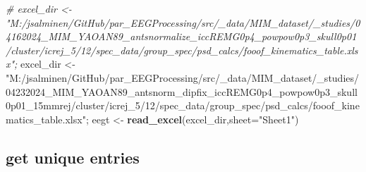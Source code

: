 \documentclass[
]{article}
\newenvironment{Shaded}{\begin{snugshade}}{\end{snugshade}}
\newcommand{\AttributeTok}[1]{\textcolor[rgb]{0.13,0.29,0.53}{#1}}
\newcommand{\CommentTok}[1]{\textcolor[rgb]{0.56,0.35,0.01}{\textit{#1}}}
\newcommand{\FunctionTok}[1]{\textcolor[rgb]{0.13,0.29,0.53}{\textbf{#1}}}
\newcommand{\NormalTok}[1]{#1}
\newcommand{\OtherTok}[1]{\textcolor[rgb]{0.56,0.35,0.01}{#1}}
\newcommand{\SpecialCharTok}[1]{\textcolor[rgb]{0.81,0.36,0.00}{\textbf{#1}}}
\newcommand{\StringTok}[1]{\textcolor[rgb]{0.31,0.60,0.02}{#1}}
\begin{document}
\begin{Shaded}
\begin{Highlighting}[]
\CommentTok{\# excel\_dir \textless{}{-}"M:/jsalminen/GitHub/par\_EEGProcessing/src/\_data/MIM\_dataset/\_studies/04162024\_MIM\_YAOAN89\_antsnormalize\_iccREMG0p4\_powpow0p3\_skull0p01/cluster/icrej\_5/12/spec\_data/group\_spec/psd\_calcs/fooof\_kinematics\_table.xlsx";}
\NormalTok{excel\_dir }\OtherTok{\textless{}{-}}\StringTok{"M:/jsalminen/GitHub/par\_EEGProcessing/src/\_data/MIM\_dataset/\_studies/04232024\_MIM\_YAOAN89\_antsnorm\_dipfix\_iccREMG0p4\_powpow0p3\_skull0p01\_15mmrej/cluster/icrej\_5/12/spec\_data/group\_spec/psd\_calcs/fooof\_kinematics\_table.xlsx"}\NormalTok{;}
\NormalTok{eegt }\OtherTok{\textless{}{-}} \FunctionTok{read\_excel}\NormalTok{(excel\_dir,}\AttributeTok{sheet=}\StringTok{"Sheet1"}\NormalTok{) }
\end{Highlighting}
\end{Shaded}

\hypertarget{get-unique-entries}{%
\subsection{get unique entries}\label{get-unique-entries}}

\begin{Shaded}
\end{Shaded}
\end{document}
